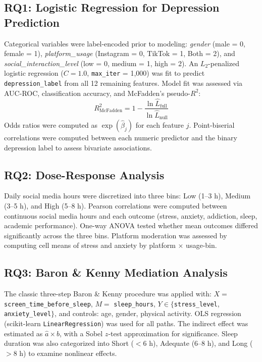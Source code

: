 \documentclass[11pt]{article}
\begin{document}
\subsection{RQ1: Logistic Regression for Depression Prediction}

Categorical variables were label-encoded prior to modeling: \textit{gender}
(male = 0, female = 1), \textit{platform\_usage} (Instagram = 0, TikTok = 1, Both = 2), and
\textit{social\_interaction\_level} (low = 0, medium = 1, high = 2).  An $L_2$-penalized
logistic regression ($C = 1.0$, \texttt{max\_iter} = 1{,}000) was fit to predict
\texttt{depression\_label} from all 12 remaining features.  Model fit was assessed via AUC-ROC,
classification accuracy, and McFadden's pseudo-$R^2$:
\begin{equation}
R^2_{\text{McFadden}} = 1 - \frac{\ln \hat{L}_{\text{full}}}{\ln \hat{L}_{\text{null}}}
\end{equation}
Odds ratios were computed as $\exp(\hat{\beta}_j)$ for each feature $j$.  Point-biserial
correlations were computed between each numeric predictor and the binary depression label
to assess bivariate associations.

\subsection{RQ2: Dose-Response Analysis}

Daily social media hours were discretized into three bins:
Low (1--3 h), Medium (3--5 h), and High (5--8 h).
Pearson correlations were computed between continuous social media hours and each outcome
(stress, anxiety, addiction, sleep, academic performance).  One-way ANOVA tested whether
mean outcomes differed significantly across the three bins.
Platform moderation was assessed by computing cell means of stress and anxiety by platform
$\times$ usage-bin.

\subsection{RQ3: Baron \& Kenny Mediation Analysis}

The classic three-step Baron \& Kenny procedure was applied with:
$X =$ \texttt{screen\_time\_before\_sleep},
$M =$ \texttt{sleep\_hours},
$Y \in \{$\texttt{stress\_level}, \texttt{anxiety\_level}$\}$,
and controls: age, gender, physical activity.
OLS regression (scikit-learn \texttt{LinearRegression}) was used for all paths.
The indirect effect was estimated as $\hat{a} \times \hat{b}$, with a Sobel $z$-test
approximation for significance.  Sleep duration was also categorized into
Short ($<$6 h), Adequate (6--8 h), and Long ($>$8 h) to examine nonlinear effects.
\end{document}
